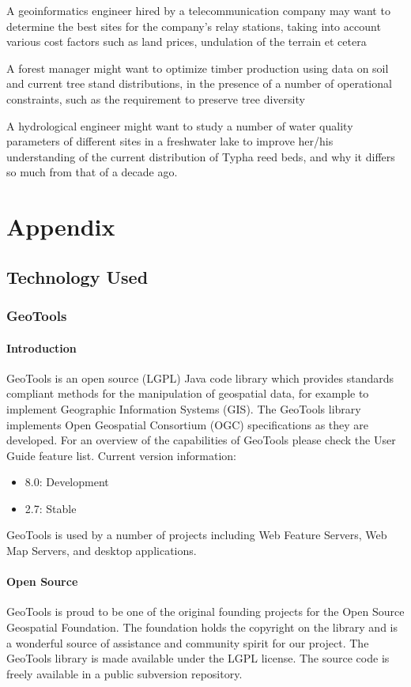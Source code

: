 A geoinformatics engineer hired by a telecommunication company may want to determine the best sites for the company’s relay stations, taking into account various cost factors such as land prices, undulation of the terrain et cetera

A forest manager might want to optimize timber production using data on soil and current tree stand distributions, in the presence of a number of operational constraints, such as the requirement to preserve tree diversity

A hydrological engineer might want to study a number of water quality parameters of different sites in a freshwater lake to improve her/his understanding of the current distribution of  Typha reed beds, and why it differs so much from that of a decade ago.

\chapter{Appendix}
\section{Technology Used}
\subsection{GeoTools}
\subsubsection{Introduction}
GeoTools is an open source (LGPL) Java code library which provides standards compliant methods for the manipulation of geospatial data, for example to implement Geographic Information Systems (GIS). The GeoTools library implements Open Geospatial Consortium (OGC) specifications as they are developed.
For an overview of the capabilities of GeoTools please check the User Guide feature list.
Current version information:
\begin{itemize}
\item 8.0: Development
\item 2.7: Stable
\end{itemize}
GeoTools is used by a number of projects including Web Feature Servers, Web Map Servers, and desktop applications.

\subsubsection{Open Source}
GeoTools is proud to be one of the original founding projects for the Open Source Geospatial Foundation. The foundation holds the copyright on the library and is a wonderful source of assistance and community spirit for our project. The GeoTools library is made available under the LGPL license. The source code is freely available in a public subversion repository.

